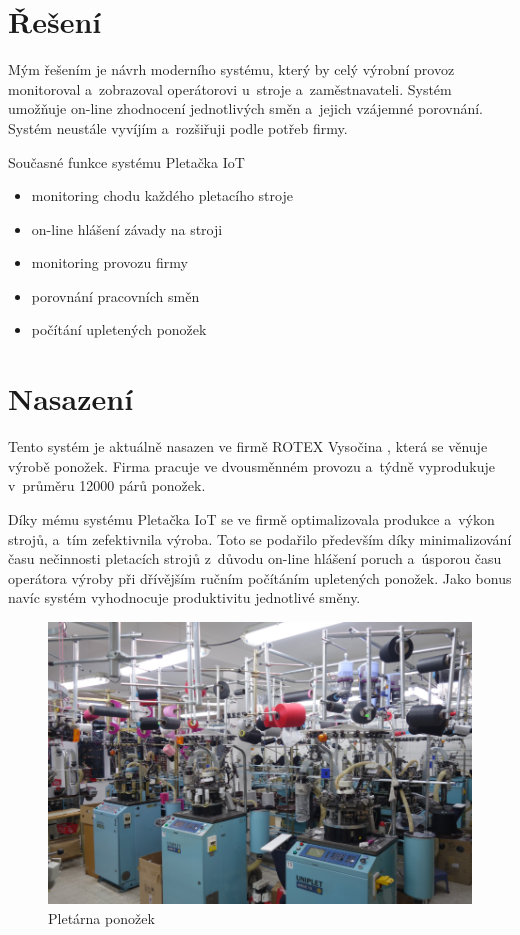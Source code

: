 \section{Řešení}
Mým řešením je návrh moderního systému, který by celý výrobní provoz monitoroval a~zobrazoval operátorovi u~stroje a~zaměstnavateli.
Systém umožňuje on-line zhodnocení jednotlivých směn a~jejich vzájemné porovnání.
Systém neustále vyvíjím a~rozšiřuji podle potřeb firmy.

Současné funkce systému Pletačka IoT
\begin{itemize}
    \item monitoring chodu každého pletacího stroje
    \item on-line hlášení závady na stroji
    \item monitoring provozu firmy
    \item porovnání pracovních směn
    \item počítání upletených ponožek
\end{itemize}



\section{Nasazení}
Tento systém je aktuálně nasazen ve firmě ROTEX Vysočina \cite{ROTEX}, která se věnuje výrobě ponožek. 
Firma pracuje ve dvousměnném provozu a~týdně vyprodukuje v~průměru 12000 párů ponožek. 

Díky mému systému Pletačka IoT se ve firmě optimalizovala produkce a výkon strojů, a tím zefektivnila výroba. 
Toto se podařilo především díky minimalizování času nečinnosti pletacích strojů z důvodu on-line hlášení poruch a~úsporou času operátora výroby při dřívějším ručním počítáním upletených ponožek. 
Jako bonus navíc systém vyhodnocuje produktivitu jednotlivé směny.

\begin{figure}[htbp]
    \centering
    \includegraphics[width=\textwidth]{img/pletarna.png}
    \caption{Pletárna ponožek}
    \label{fig:Pletarna}
\end{figure}



\newpage